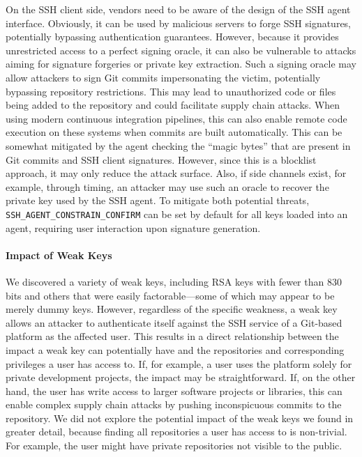 On the SSH client side, vendors need to be aware of the design of the SSH agent interface. Obviously, it can be used by malicious servers to forge SSH signatures, potentially bypassing authentication guarantees. However, because it provides unrestricted access to a perfect signing oracle, it can also be vulnerable to attacks aiming for signature forgeries or private key extraction. Such a signing oracle may allow attackers to sign Git commits impersonating the victim, potentially bypassing repository restrictions. This may lead to unauthorized code or files being added to the repository and could facilitate supply chain attacks. When using modern continuous integration pipelines, this can also enable remote code execution on these systems when commits are built automatically. This can be somewhat mitigated by the agent checking the ``magic bytes'' that are present in Git commits and SSH client signatures. However, since this is a blocklist approach, it may only reduce the attack surface. Also, if side channels exist, for example, through timing, an attacker may use such an oracle to recover the private key used by the SSH agent. To mitigate both potential threats, \texttt{SSH\_AGENT\_CONSTRAIN\_CONFIRM} can be set by default for all keys loaded into an agent, requiring user interaction upon signature generation.

\paragraph{Impact of Weak Keys}

We discovered a variety of weak keys, including RSA keys with fewer than 830 bits and others that were easily factorable---some of which may appear to be merely dummy keys. However, regardless of the specific weakness, a weak key allows an attacker to authenticate itself against the SSH service of a Git-based platform as the affected user. This results in a direct relationship between the impact a weak key can potentially have and the repositories and corresponding privileges a user has access to. If, for example, a user uses the platform solely for private development projects, the impact may be straightforward. If, on the other hand, the user has write access to larger software projects or libraries, this can enable complex supply chain attacks by pushing inconspicuous commits to the repository. We did not explore the potential impact of the weak keys we found in greater detail, because finding all repositories a user has access to is non-trivial. For example, the user might have private repositories not visible to the public.
